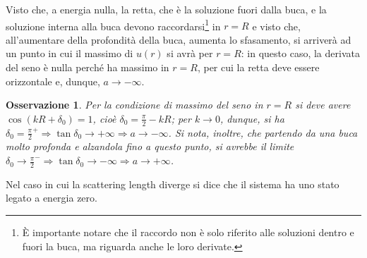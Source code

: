 \documentclass[11pt, a4paper]{scrartcl}
\theoremstyle{style}
\newtheorem{osservazione}{Osservazione}[section]
\numberwithin{equation}{subsection}
\begin{document}
\begin{center}
\end{center}
Visto che, a energia nulla, la retta, che \`e la soluzione fuori dalla buca, e la soluzione interna alla buca devono raccordarsi\footnote{\`E importante notare che il raccordo non \`e solo riferito alle soluzioni dentro e fuori la buca, ma riguarda anche le loro derivate.} in $r=R$ e visto che, all'aumentare della profondit\`a della buca, aumenta lo sfasamento, si arriver\`a ad un punto in cui il massimo di $u(r)$ si avr\`a per $r=R$: in questo caso, la derivata del seno \`e nulla perch\'e ha massimo in $r=R$, per cui la retta deve essere orizzontale e, dunque, $a\to -\infty$. 
\begin{osservazione}
	Per la condizione di massimo del seno in $r=R$ si deve avere $\cos(kR + \delta _0) = 1$, cio\`e $\delta _0 = \frac{\pi}{2} - kR$; per $k\to 0$, dunque, si ha $\delta _0 = \frac{\pi}{2}^+\Rightarrow \tan \delta _0 \to +\infty\Rightarrow a \to -\infty $.
	Si nota, inoltre, che partendo da una buca molto profonda e alzandola fino a questo punto, si avrebbe il limite $\delta _0 \to \frac{\pi}{2}^- \Rightarrow \tan\delta _0 \to -\infty\Rightarrow a \to +\infty$.
\end{osservazione}
\noindent Nel caso in cui la scattering length diverge si dice che il sistema ha uno stato legato a energia zero.
\end{document}
